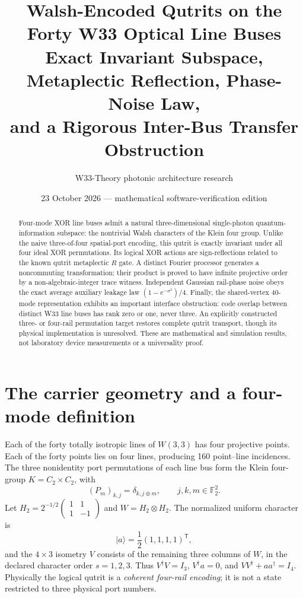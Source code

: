 \documentclass[10pt]{article}
\title{\textbf{Walsh-Encoded Qutrits on the Forty W33 Optical Line Buses}\\
Exact Invariant Subspace, Metaplectic Reflection, Phase-Noise Law,\\
and a Rigorous Inter-Bus Transfer Obstruction}
\author{W33-Theory photonic architecture research}
\date{23 October 2026 --- mathematical software-verification edition}
\begin{document}
\maketitle
\begin{abstract}
Four-mode XOR line buses admit a natural three-dimensional
single-photon quantum-information subspace: the nontrivial
Walsh characters of the Klein four group. Unlike the naive
three-of-four spatial-port encoding, this qutrit is exactly
invariant under all four ideal XOR permutations. Its logical
XOR actions are sign-reflections related to the known qutrit
metaplectic $R$ gate. A distinct Fourier processor generates a
noncommuting transformation; their product is proved to have
infinite projective order by a non-algebraic-integer trace
witness. Independent Gaussian rail-phase noise obeys the
exact average auxiliary leakage law
$(1-e^{-\sigma^2})/4$. Finally, the shared-vertex
40-mode representation exhibits an important interface
obstruction: code overlap between distinct W33 line buses
has rank zero or one, never three. An explicitly constructed
three- or four-rail permutation target restores complete
qutrit transport, though its physical implementation is
unresolved. These are mathematical and simulation results,
not laboratory device measurements or a universality proof.
\end{abstract}
\tableofcontents

\section{The carrier geometry and a four-mode definition}
Each of the forty totally isotropic lines of $W(3,3)$ has
four projective points. Each of the forty points lies on
four lines, producing 160 point--line incidences. The
three nonidentity port permutations of each line bus
form the Klein four-group $K=C_2\times C_2$, with
\[
 (P_m)_{k,j}=\delta_{k,j\oplus m},
 \qquad j,k,m\in\mathbb F_2^2 .
\]
Let $H_2=2^{-1/2}\left(\begin{smallmatrix}1&1\\
1&-1\end{smallmatrix}\right)$ and $W=H_2\otimes H_2$.
The normalized uniform character is
\[
 |a\rangle=\frac{1}{2}(1,1,1,1)^{\mathsf T},
\]
and the $4\times3$ isometry $V$ consists of the remaining
three columns of $W$, in the declared character order
$s=1,2,3$. Thus $V^\dagger V=I_3$, $V^\dagger a=0$,
and $VV^\dagger+aa^\dagger=I_4$. Physically the logical
qutrit is a \emph{coherent four-rail encoding}; it is not
a state restricted to three physical port numbers.
\end{document}
